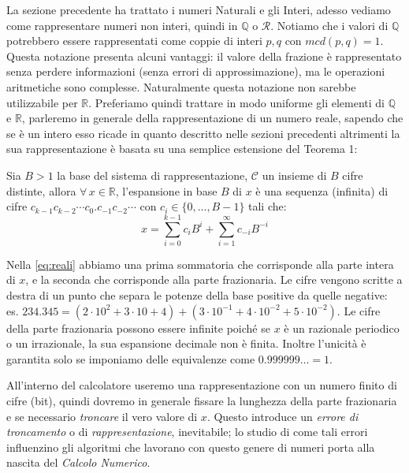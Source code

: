 La sezione precedente ha trattato i numeri Naturali e gli Interi, adesso
vediamo come rappresentare numeri non interi, quindi in $\mathbb{Q}$ o
$\mathcal{R}$. Notiamo che i valori di $\mathbb{Q}$ potrebbero essere
rappresentati come coppie di interi $p, q$ con $mcd(p,q) = 1$. Questa notazione
presenta alcuni vantaggi: il valore della frazione è rappresentato senza
perdere informazioni (senza errori di approssimazione), ma le operazioni
aritmetiche sono complesse. Naturalmente questa notazione non sarebbe
utilizzabile per $\mathbb{R}$. Preferiamo quindi trattare in modo uniforme gli
elementi di $\mathbb{Q}$ e $\mathbb{R}$, parleremo in generale della
rappresentazione di un numero reale, sapendo che se è un intero esso ricade in
quanto descritto nelle sezioni precedenti altrimenti la sua rappresentazione è
basata su una semplice estensione del Teorema 1:

\begin{thm}
\label{thm:F}
Sia $B>1$ la base del sistema di rappresentazione, $\mathcal{C}$ un insieme
di $B$ cifre distinte, allora $\forall\, x \in \mathbb{R}$, l'espansione in base $B$ di $x$ è una sequenza (infinita) di cifre $c_{k-1}c_{k-2}{\cdots}c_0\mathbf{.}c_{-1}c_{-2}\cdots$ con $c_i \in \{0,...,B-1\}$ tali che:
\begin{equation}\label{eq:reali}
	x = \sum_{i=0}^{k-1} c_iB^i + \sum_{i=1}^{\infty} c_{-i}B^{-i}
\end{equation}
\end{thm}

Nella \eqref{eq:reali} abbiamo una prima sommatoria che corrisponde alla parte
intera di $x$, e la seconda che corrisponde alla parte frazionaria. Le cifre
vengono scritte a destra di un punto che separa le potenze della base positive
da quelle negative: es. $234.345 =
(2\cdot10^2+3\cdot10+4)+(3\cdot10^{-1}+4\cdot10^{-2}+5\cdot10^{-2})$. Le cifre
della parte frazionaria possono essere infinite poiché se $x$ è un razionale
periodico o un irrazionale, la sua espansione decimale non è finita. Inoltre
l'unicità è garantita solo se imponiamo delle equivalenze come $0.999999\ldots = 1$.

All'interno del calcolatore useremo una rappresentazione con un numero finito
di cifre (bit), quindi dovremo in generale fissare la lunghezza della parte
frazionaria e se necessario \emph{troncare} il vero valore di $x$. Questo
introduce un \emph{errore di troncamento} o di \emph{rappresentazione},
inevitabile; lo studio di come tali errori influenzino gli algoritmi che
lavorano con questo genere di numeri porta alla nascita del \emph{Calcolo
Numerico}.

